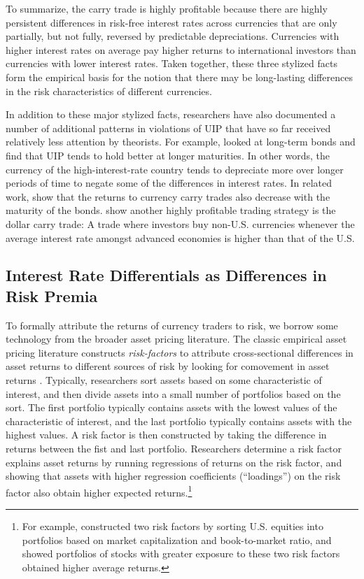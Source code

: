 \documentclass{ar-1col}
\begin{document}
To summarize, the carry trade is highly profitable because there are highly persistent differences in risk-free interest rates across currencies that are only partially, but not fully, reversed by predictable depreciations. Currencies with higher interest rates on average pay higher returns to international investors than currencies with lower interest rates. Taken together, these three stylized facts form the empirical basis for the notion that there may be long-lasting differences in the risk characteristics of different currencies.

In addition to these major stylized facts, researchers have also documented a number of additional patterns in violations of UIP that have so far received relatively less attention by theorists. For example, \citet{ChinnMeredith2004} looked at long-term bonds and find that UIP tends to hold better at longer maturities. In other words, the currency of the high-interest-rate country tends to depreciate more over longer periods of time to negate some of the differences in interest rates. In related work, \citet{LustigStathopoulosVerdelhan2019} show that the returns to currency carry trades also decrease with the maturity of the bonds. \citet{LRV2014} show another highly profitable trading strategy is the dollar carry trade: A trade where investors buy non-U.S. currencies whenever the average interest rate amongst advanced economies is higher than that of the U.S. 


\subsection{Interest Rate Differentials as Differences in Risk Premia \label{sec_RP}}


To formally attribute the returns of currency traders to risk, we borrow some technology from the broader asset pricing literature. The classic empirical asset pricing literature constructs \emph{risk-factors} to attribute cross-sectional differences in asset returns to different sources of risk by looking for comovement in asset returns \citep{Fama1976}. Typically, researchers sort assets based on some characteristic of interest, and then divide assets into a small number of portfolios based on the sort. The first portfolio typically contains assets with the lowest values of the characteristic of interest, and the last portfolio typically contains assets with the highest values. A risk factor is then constructed by taking the difference in returns between the fist and last portfolio. Researchers determine a risk factor explains asset returns by running regressions of returns on the risk factor, and showing that assets with higher regression coefficients (``loadings'') on the risk factor also obtain higher expected returns.\footnote{For example, \citet{FamaFrench1992} constructed two risk factors by sorting U.S. equities into portfolios based on market capitalization and book-to-market ratio, and showed portfolios of stocks with greater exposure to these two risk factors obtained higher average returns.}
\end{document}
